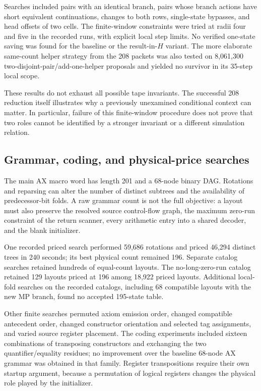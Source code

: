 \documentclass[11pt,a4paper]{article}
\begin{document}
Searches included pairs with an identical branch, pairs whose branch
actions have short equivalent continuations, changes to both rows,
single-state bypasses, and head offsets of two cells. The finite-window
constraints were tried at radii four and five in the recorded runs, with
explicit local step limits. No verified one-state saving was found for
the baseline or the result-in-$H$ variant. The more elaborate same-count
helper strategy from the 208 packets was also tested on 8,061,300
two-disjoint-pair/add-one-helper proposals and yielded no survivor in its
35-step local scope.

These results do not exhaust all possible tape invariants. The successful
208 reduction itself illustrates why a previously unexamined conditional
context can matter. In particular, failure of this finite-window procedure
does not prove that two roles cannot be identified by a stronger invariant
or a different simulation relation.

\subsection{Grammar, coding, and physical-price searches}

The main AX macro word has length 201 and a 68-node binary DAG.
Rotations and reparsing can alter the number of distinct subtrees and
the availability of predecessor-bit folds. A raw grammar count is not
the full objective: a layout must also preserve the resolved source
control-flow graph, the maximum zero-run constraint of the return scanner,
every arithmetic entry into a shared decoder, and the blank initializer.

One recorded priced search performed 59,686 rotations and priced 46,294
distinct trees in 240 seconds; its best physical count remained 196.
Separate catalog searches retained hundreds of equal-count layouts.
The no-long-zero-run catalog retained 129 layouts priced at 196 among
18,922 priced layouts. Additional local-fold searches on the recorded
catalogs, including 68 compatible layouts with the new MP branch, found
no accepted 195-state table.

Other finite searches permuted axiom emission order, changed compatible
antecedent order, changed constructor orientation and selected tag
assignments, and varied source register placement. The coding experiments
included sixteen combinations of transposing constructors and exchanging
the two quantifier/equality residues; no improvement over the baseline
68-node AX grammar was obtained in that family. Register transpositions
require their own startup argument, because a permutation of logical
registers changes the physical role played by the initializer.
\end{document}
